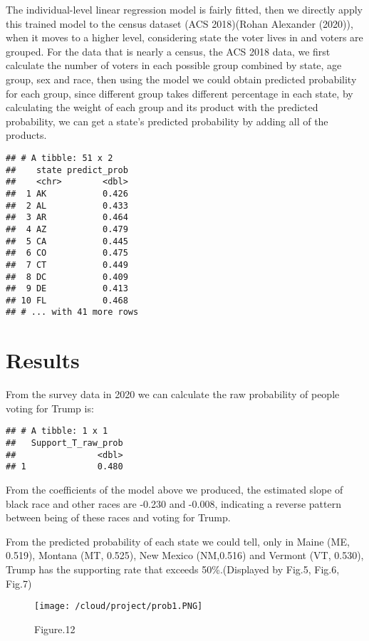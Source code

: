 \documentclass[
]{article}
\begin{document}
The individual-level linear regression model is fairly fitted, then we
directly apply this trained model to the census dataset (ACS 2018)(Rohan
Alexander (2020)), when it moves to a higher level, considering state
the voter lives in and voters are grouped. For the data that is nearly a
census, the ACS 2018 data, we first calculate the number of voters in
each possible group combined by state, age group, sex and race, then
using the model we could obtain predicted probability for each group,
since different group takes different percentage in each state, by
calculating the weight of each group and its product with the predicted
probability, we can get a state's predicted probability by adding all of
the products.

\begin{verbatim}
## # A tibble: 51 x 2
##    state predict_prob
##    <chr>        <dbl>
##  1 AK           0.426
##  2 AL           0.433
##  3 AR           0.464
##  4 AZ           0.479
##  5 CA           0.445
##  6 CO           0.475
##  7 CT           0.449
##  8 DC           0.409
##  9 DE           0.413
## 10 FL           0.468
## # ... with 41 more rows
\end{verbatim}

\hypertarget{results}{%
\section{Results}\label{results}}

From the survey data in 2020 we can calculate the raw probability of
people voting for Trump is:

\begin{verbatim}
## # A tibble: 1 x 1
##   Support_T_raw_prob
##                <dbl>
## 1              0.480
\end{verbatim}

From the coefficients of the model above we produced, the estimated
slope of black race and other races are -0.230 and -0.008, indicating a
reverse pattern between being of these races and voting for Trump.

From the predicted probability of each state we could tell, only in
Maine (ME, 0.519), Montana (MT, 0.525), New Mexico (NM,0.516) and
Vermont (VT, 0.530), Trump has the supporting rate that exceeds
50\%.(Displayed by Fig.5, Fig.6, Fig.7)

\begin{figure}
\centering
\texttt{[image: /cloud/project/prob1.PNG]}
\caption{Figure.12}
\end{figure}
\end{document}
